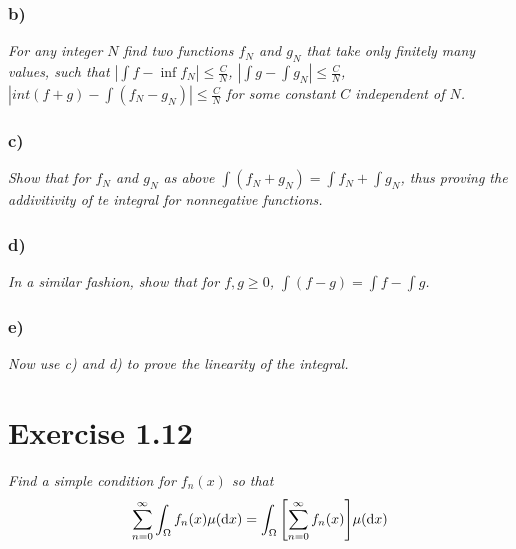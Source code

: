 \documentclass[12pt]{article}
\theoremstyle{plain}
\begin{document}
\subsubsection*{ b)}
\textit{For any integer $N$ find two functions $f_N$ and $g_N$ that take only finitely many values, such that $|\int f - \inf f_N| \leq \frac{C}{N}$, $|\int g - \int g_N| \leq \frac{C}{N}$, $|int(f + g) - \int(f_N - g_N)| \leq \frac{C}{N}$ for some constant $C$ independent of $N$.}

\subsubsection*{ c)}
\textit{Show that for $f_N$ and $g_N$ as above $\int(f_N + g_N) = \int f_N + \int g_N$, thus proving the addivitivity of te integral for nonnegative functions.}

\subsubsection*{ d)}
\textit{In a similar fashion, show that for $f, g \geq 0$, $\int(f - g) = \int f - \int g$.}

\subsubsection*{ e)}
\textit{Now use c) and d) to prove the linearity of the integral.}

\section*{Exercise 1.12}
\textit{Find a simple condition for $f_n(x)$ so that}
\begin{align*}
    \sum_{n=0}^\infty \int_\Omega f_n(x) \mu(\dd x) = \int_\Omega \qty[\sum_{n=0}^\infty f_n(x)]\mu(\dd x)
\end{align*}
\end{document}
